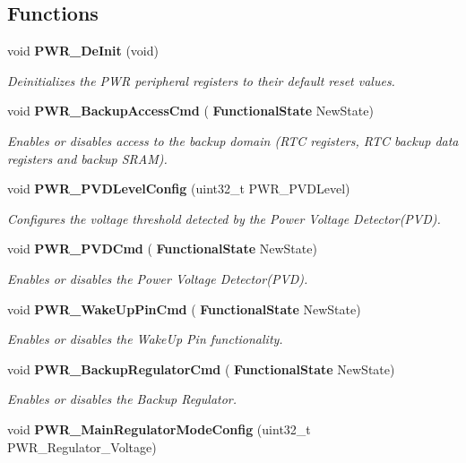 \subsection*{Functions}
\begin{DoxyCompactItemize}
\item 
void \textbf{ P\+W\+R\+\_\+\+De\+Init} (void)
\begin{DoxyCompactList}\small\item\em Deinitializes the P\+WR peripheral registers to their default reset values. \end{DoxyCompactList}\item 
void \textbf{ P\+W\+R\+\_\+\+Backup\+Access\+Cmd} (\textbf{ Functional\+State} New\+State)
\begin{DoxyCompactList}\small\item\em Enables or disables access to the backup domain (R\+TC registers, R\+TC backup data registers and backup S\+R\+AM). \end{DoxyCompactList}\item 
void \textbf{ P\+W\+R\+\_\+\+P\+V\+D\+Level\+Config} (uint32\+\_\+t P\+W\+R\+\_\+\+P\+V\+D\+Level)
\begin{DoxyCompactList}\small\item\em Configures the voltage threshold detected by the Power Voltage Detector(\+P\+V\+D). \end{DoxyCompactList}\item 
void \textbf{ P\+W\+R\+\_\+\+P\+V\+D\+Cmd} (\textbf{ Functional\+State} New\+State)
\begin{DoxyCompactList}\small\item\em Enables or disables the Power Voltage Detector(\+P\+V\+D). \end{DoxyCompactList}\item 
void \textbf{ P\+W\+R\+\_\+\+Wake\+Up\+Pin\+Cmd} (\textbf{ Functional\+State} New\+State)
\begin{DoxyCompactList}\small\item\em Enables or disables the Wake\+Up Pin functionality. \end{DoxyCompactList}\item 
void \textbf{ P\+W\+R\+\_\+\+Backup\+Regulator\+Cmd} (\textbf{ Functional\+State} New\+State)
\begin{DoxyCompactList}\small\item\em Enables or disables the Backup Regulator. \end{DoxyCompactList}\item 
void \textbf{ P\+W\+R\+\_\+\+Main\+Regulator\+Mode\+Config} (uint32\+\_\+t P\+W\+R\+\_\+\+Regulator\+\_\+\+Voltage)

\end{DoxyCompactItemize}
